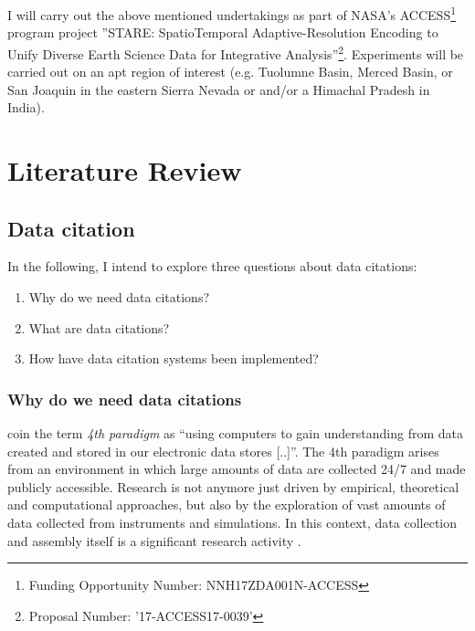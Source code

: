 \documentclass[a4paper,10pt]{article}
\begin{document}
I will carry out the above mentioned undertakings as part of NASA's \gls{ACCESS}\footnote{Funding Opportunity Number: NNH17ZDA001N-ACCESS} program project ''STARE: SpatioTemporal Adaptive-Resolution Encoding to Unify Diverse Earth Science Data for Integrative Analysis''\footnote{Proposal Number: '17-ACCESS17-0039'}. Experiments will be carried out on an apt region of interest (e.g. Tuolumne Basin, Merced Basin, or San Joaquin in the eastern Sierra Nevada or and/or a Himachal Pradesh in India). 




\newpage
\section{Literature Review}

\subsection{Data citation}
In the following, I intend to explore three questions about data citations:

\begin{enumerate}
 \item Why do we need data citations?
 \item What are data citations?
 \item How have data citation systems been implemented?
\end{enumerate}

\subsubsection{Why do we need data citations}    
\cite{Hey2009} coin the term \textit{4th paradigm} as ``using computers to gain understanding from data created and stored in our electronic data stores [..]''.
The 4th paradigm arises from an environment in which large amounts of data are collected 24/7 and made publicly accessible. Research is not anymore just driven by empirical, theoretical and computational approaches, but also by the exploration of vast amounts of data collected from instruments and simulations. In this context, data collection and assembly itself is a significant research activity \citep{Frew2012}.
\end{document}
